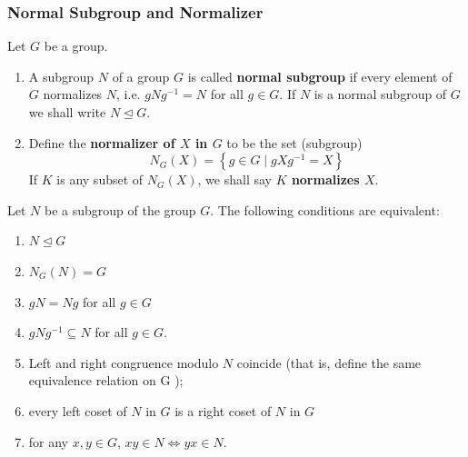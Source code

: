 \subsubsection{Normal Subgroup and Normalizer}
\begin{definition}
    Let $G$ be a group.
    \begin{enumerate}
        \item
              A subgroup $N$ of a group $G$ is called \textbf{normal subgroup} if every element of $G$ normalizes $N$, i.e. $g N g^{-1}=N$ for all $g \in G$. If $N$ is a normal subgroup of $G$ we shall write $N \unlhd G$.

        \item
              Define the \textbf{normalizer of $X$ in $G$} to be the set (subgroup)
              \begin{equation*}
                  N_G(X)=\left\{g \in G \mid g X g^{-1}=X\right\}
              \end{equation*}
              If $K$ is any subset of $N_G(X)$, we shall say \textbf{$K$ normalizes $X$}.
    \end{enumerate}
\end{definition}
\begin{theorem}
    Let $N$ be a subgroup of the group $G$. The following conditions are equivalent:
    \begin{enumerate}
        \item
              $N \unlhd G$


        \item
              $N_G(N)=G$

        \item
              $g N=N g$ for all $g \in G$

        \item
              $g N g^{-1} \subseteq N$ for all $g \in G$.

        \item
              Left and right congruence modulo $N$ coincide (that is, define the same equivalence relation on G );

        \item
              every left coset of $N$ in $G$ is a right coset of $N$ in $G$
        \item for any $x,y\in G$, $xy\in N\Leftrightarrow yx\in N $.
    \end{enumerate}
\end{theorem}



